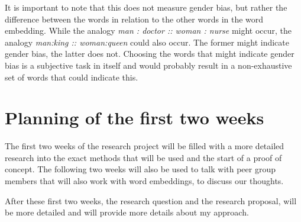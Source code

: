 \documentclass[english, a4paper, 10pt]{article}
\begin{document}
It is important to note that this does not measure gender bias, but rather the difference between the words in relation to the other words in the word embedding.
While the analogy \textit{man : doctor :: woman : nurse} might occur, the analogy \textit{man:king :: woman:queen} could also occur.
The former might indicate gender bias, the latter does not.
Choosing the words that might indicate gender bias is a subjective task in itself and would probably result in a non-exhaustive set of words that could indicate this.

\section*{Planning of the first two weeks}
The first two weeks of the research project will be filled with a more detailed research
into the exact methods that will be used and the start of a proof of concept.
The following two weeks will also be used to talk with peer group members that will also work with word embeddings, to discuss our thoughts.

After these first two weeks, the research question and the research proposal, will be
more detailed and will provide more details about my approach.

\printbibliography
\end{document}
